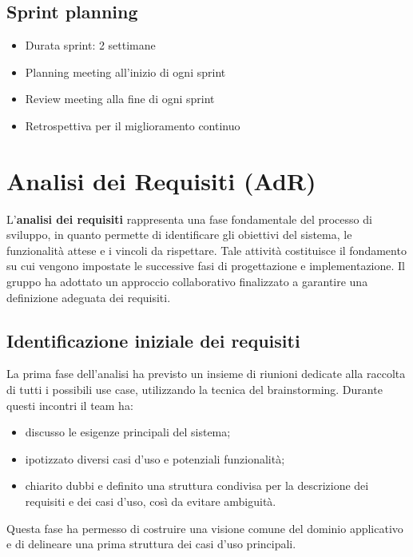 \documentclass[11pt,a4paper]{article}
\begin{document}
\subsection{Sprint planning}
\begin{itemize}
    \item Durata sprint: 2 settimane
    \item Planning meeting all'inizio di ogni sprint
    \item Review meeting alla fine di ogni sprint
    \item Retrospettiva per il miglioramento continuo
\end{itemize}

\newpage

\section{Analisi dei Requisiti (AdR)}
L’\textbf{analisi dei requisiti} rappresenta una fase fondamentale del processo di sviluppo, in quanto permette di identificare gli obiettivi del sistema, le funzionalità attese e i vincoli da rispettare. Tale attività costituisce il fondamento su cui vengono impostate le successive fasi di progettazione e implementazione. 
Il gruppo ha adottato un approccio collaborativo finalizzato a garantire una definizione adeguata dei requisiti.

\subsection{Identificazione iniziale dei requisiti}
La prima fase dell’analisi ha previsto un insieme di riunioni dedicate alla raccolta di tutti i possibili use case, utilizzando la tecnica del brainstorming. Durante questi incontri il team ha:
\begin{itemize}
\item discusso le esigenze principali del sistema;
\item ipotizzato diversi casi d’uso e potenziali funzionalità;
\item chiarito dubbi e definito una struttura condivisa per la descrizione dei requisiti e dei casi d’uso, così da evitare ambiguità.
\end{itemize}
Questa fase ha permesso di costruire una visione comune del dominio applicativo e di delineare una prima struttura dei casi d’uso principali.
\end{document}
